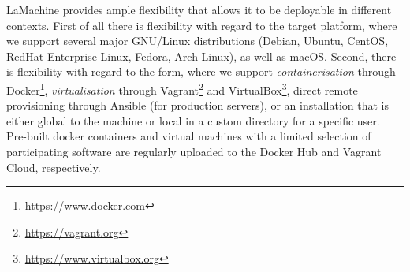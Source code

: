 \documentclass[a4paper,11pt]{article}
\begin{document}
LaMachine provides ample flexibility that allows it to be deployable in different contexts. First of all there is
flexibility with regard to the target platform, where we support several major GNU/Linux distributions (Debian, Ubuntu,
CentOS, RedHat Enterprise Linux, Fedora, Arch Linux), as well as macOS. Second, there is flexibility with
regard to the form, where we support \emph{containerisation} through Docker\footnote{\url{https://www.docker.com}},
\emph{virtualisation} through Vagrant\footnote{\url{https://vagrant.org}} and VirtualBox\footnote{\url{https://www.virtualbox.org}},
direct remote provisioning through Ansible (for production servers), or an installation that is either global to the
machine or local in a custom directory for a specific user. Pre-built docker containers and virtual machines with a
limited selection of participating software are regularly uploaded to the Docker Hub and Vagrant Cloud, respectively.

%
%
\end{document}
